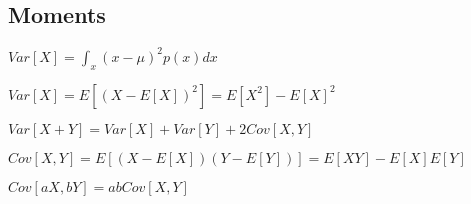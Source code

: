\subsection*{Moments}
\begin{inparaitem}[\color{red}\textbullet]
\item $Var[X]=\int_x(x-\mu)^2p(x) dx$ \\
\item $Var[X]=E[(X-E[X])^2]=E[X^2]-E[X]^2$ \\
\item $Var[X{+}Y]=Var[X]{+}Var[Y]{+}2Cov[X,Y]$ \\
\item $Cov[X,Y] = E[(X - E[X])(Y - E[Y])] = E[XY] - E[X]E[Y]$ \\
\item $Cov[aX,bY]{=}abCov[X,Y]$
\end{inparaitem}

